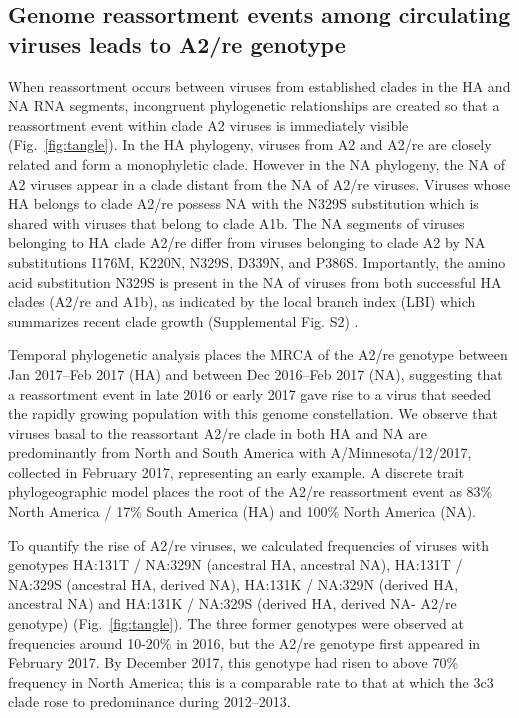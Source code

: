 \subsection*{Genome reassortment events among circulating viruses leads to A2/re genotype}
When reassortment occurs between viruses from established clades in the HA and NA RNA segments, incongruent phylogenetic relationships are created so that a reassortment event within clade A2 viruses is immediately visible (Fig.~\ref{fig:tangle}).
In the HA phylogeny, viruses from A2 and A2/re are closely related and form a monophyletic clade.
However in the NA phylogeny, the NA of A2 viruses appear in a clade distant from the NA of A2/re viruses.
Viruses whose HA belongs to clade A2/re possess NA with the N329S substitution which is shared with viruses that belong to clade A1b.
The NA segments of viruses belonging to HA clade A2/re differ from viruses belonging to clade A2 by NA substitutions I176M, K220N, N329S, D339N, and P386S.
Importantly, the amino acid substitution N329S is present in the NA of viruses from both successful HA clades (A2/re and A1b), as indicated by the local branch index (LBI) which summarizes recent clade growth (Supplemental Fig. S2) \citep{neher_predicting_2014}.

Temporal phylogenetic analysis places the MRCA of the A2/re genotype between Jan 2017--Feb 2017 (HA) and between Dec 2016--Feb 2017 (NA), suggesting that a reassortment event in late 2016 or early 2017 gave rise to a virus that seeded the rapidly growing population with this genome constellation.
We observe that viruses basal to the reassortant A2/re clade in both HA and NA are predominantly from North and South America with A/Minnesota/12/2017, collected in February 2017, representing an early example.
A discrete trait phylogeographic model places the root of the A2/re reassortment event as 83\% North America / 17\% South America (HA) and 100\% North America (NA).

To quantify the rise of A2/re viruses, we calculated frequencies of viruses with genotypes HA:131T / NA:329N (ancestral HA, ancestral NA), HA:131T / NA:329S (ancestral HA, derived NA), HA:131K / NA:329N (derived HA, ancestral NA) and HA:131K / NA:329S (derived HA, derived NA- A2/re genotype) (Fig.~\ref{fig:tangle}).
The three former genotypes were observed at frequencies around 10-20\% in 2016, but the A2/re genotype first appeared in February 2017.
By December 2017, this genotype had risen to above 70\% frequency in North America; this is a comparable rate to that at which the 3c3 clade rose to predominance during 2012–2013.

